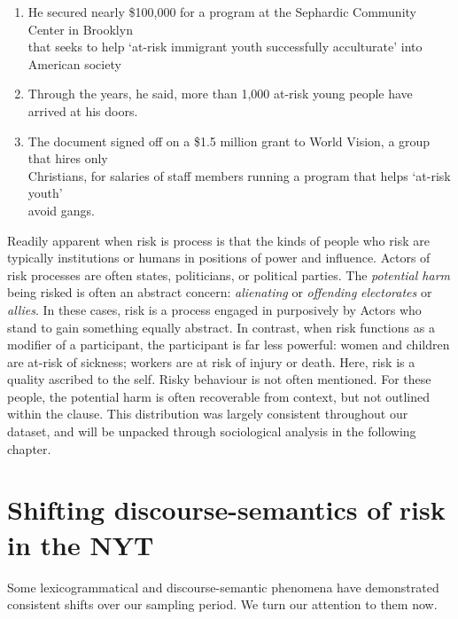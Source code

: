 \begin{enumerate}    [before=\color{black}\ttfamily] \setlength\itemsep{0em} \small

\item He secured nearly \$100,000 for a program at the Sephardic Community Center in Brooklyn \\ that seeks to help `at-risk immigrant youth successfully acculturate' into American society
\item Through the years, he said, more than 1,000 at-risk young people have arrived at his doors.
\item The document signed off on a \$1.5 million grant to World Vision, a group that hires only \\Christians, for salaries of staff members running a program that helps `at-risk youth' \\ avoid gangs.
\end{enumerate}
%
Readily apparent when risk is process is that the kinds of people who risk are typically institutions or humans in positions of power and influence. Actors of risk processes are often states, politicians, or political parties. The \emph{potential harm} being risked is often an abstract concern: \emph{alienating} or \emph{offending} \emph{electorates} or \emph{allies}. In these cases, risk is a process engaged in purposively by Actors who stand to gain something equally abstract. In contrast, when risk functions as a modifier of a participant, the participant is far less powerful: women and children are at-risk of sickness; workers are at risk of injury or death. Here, risk is a quality ascribed to the self. Risky behaviour is not often mentioned. For these people, the potential harm is often recoverable from context, but not outlined within the clause. This distribution was largely consistent throughout our dataset, and will be unpacked through sociological analysis in the following chapter. %

\section{Shifting discourse-semantics of risk in the NYT}

Some lexicogrammatical and discourse-semantic phenomena have demonstrated consistent shifts over our sampling period. We turn our attention to them now.

